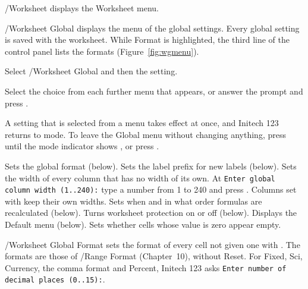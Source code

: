 /Worksheet displays the Worksheet menu.

/Worksheet Global displays the menu of the global settings.  Every global
setting is saved with the worksheet.  While Format is highlighted, the third
line of the control panel lists the formats (Figure~\ref{fig:wgmenu}).

\begin{Steps123}
\item Select /Worksheet Global and then the setting.
\item Select the choice from each further menu that appears, or answer the
  prompt and press .
\end{Steps123}
A setting that is selected from a menu takes effect at once, and Initech
123 returns to  mode.  To leave the Global menu without changing
anything, press  until the mode indicator shows , or
press .
\begin{Options}
 Sets the global format (below).
 Sets the label prefix for new labels (below).
 Sets the width of every column that has no width of
  its own.  At \texttt{Enter global column width (1..240):} type a number
  from 1 to 240 and press .  Columns set with
   keep their own widths.
 Sets when and in what order formulas are
  recalculated (below).
 Turns worksheet protection on or off (below).
 Displays the Default menu (below).
 Sets whether cells whose value is zero
  appear empty.
\end{Options}

/Worksheet Global Format sets the format of every cell not given one with
.  The formats are those of /Range Format
(Chapter~10), without Reset.  For Fixed, Sci, Currency, the comma format
and Percent, Initech 123 asks \texttt{Enter number of decimal places
(0..15):}.


